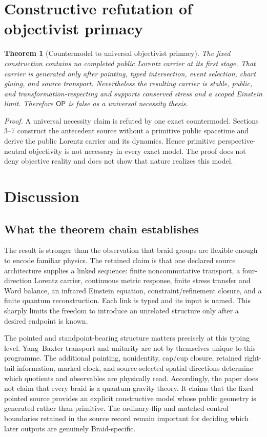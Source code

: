 \documentclass[11pt]{article}
\newtheorem{theorem}{Theorem}[section]
\theoremstyle{definition}
\theoremstyle{remark}
\newcommand{\OPT}{\mathsf{OP}}
\begin{document}
\section{Constructive refutation of objectivist primacy}

\begin{theorem}[Countermodel to universal objectivist primacy]
The fixed construction contains no completed public Lorentz carrier at its first stage. That carrier is generated only after pointing, typed intersection, event selection, chart gluing, and source transport. Nevertheless the resulting carrier is stable, public, and transformation-respecting and supports conserved stress and a scoped Einstein limit. Therefore $\OPT$ is false as a universal necessity thesis.
\end{theorem}

\textit{Proof.} A universal necessity claim is refuted by one exact countermodel. Sections 3--7 construct the antecedent source without a primitive public spacetime and derive the public Lorentz carrier and its dynamics. Hence primitive perspective-neutral objectivity is not necessary in every exact model. The proof does not deny objective reality and does not show that nature realizes this model.

\section{Discussion}

\subsection{What the theorem chain establishes}

The result is stronger than the observation that braid groups are flexible
enough to encode familiar physics. The retained claim is that one declared
source architecture supplies a linked sequence: finite noncommutative
transport, a four-direction Lorentz carrier, continuous metric response,
finite stress transfer and Ward balance, an infrared Einstein equation,
constraint/refinement closure, and a finite quantum reconstruction. Each link
is typed and its input is named. This sharply limits the freedom to introduce
an unrelated structure only after a desired endpoint is known.

The pointed and standpoint-bearing structure matters precisely at this typing
level. Yang--Baxter transport and unitarity are not by themselves unique to
this programme. The additional pointing, nonidentity, cap/cup closure, retained
right-tail information, marked clock, and source-selected spatial directions
determine which quotients and observables are physically read. Accordingly,
the paper does not claim that every braid is a quantum-gravity theory. It
claims that the fixed pointed source provides an explicit constructive model
whose public geometry is generated rather than primitive. The ordinary-flip
and matched-control boundaries retained in the source record remain important
for deciding which later outputs are genuinely Braid-specific.
\end{document}
